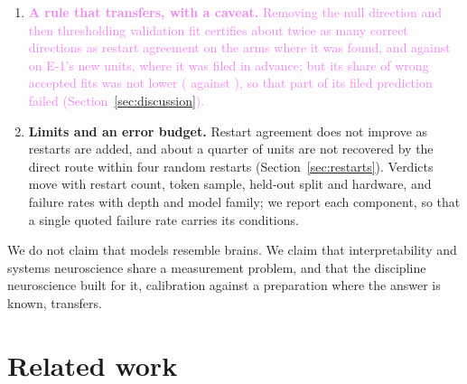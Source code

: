 \documentclass[10pt]{article}
\newcommand{\draft}[1]{\textcolor{violet}{#1}}
\begin{document}
\begin{enumerate}
{  \eOneNeoDelta{} \eOneNeoCI{} on GPT-Neo (Section~\ref{sec:eone}). Five earlier conditions re-scored
  on unseen documents give \poolTest{} \poolTestCI{} (\poolHeld{} on the fit's own documents). The
  failures being compared are the estimator's: a second estimator family recovers almost all of them
  (Section~\ref{sec:eone}; every run is listed in Appendix~\ref{app:arms}).}
  \item \draft{\textbf{A rule that transfers, with a caveat.} Removing the null direction and then
  thresholding validation fit certifies about twice as many correct directions as restart agreement
  on the arms where it was found, and \eOneRuleCorrect{} against \eOneRuleRestartCorrect{} on E-1's
  new units, where it was filed in advance; but its share of wrong accepted fits was not lower
  (\eOneRuleFcr{} against \eOneRuleRestartFcr), so that part of its filed prediction failed
  (Section~\ref{sec:discussion}).}
  \item \textbf{Limits and an error budget.} Restart agreement does not improve as restarts are
  added, and about a quarter of units are not recovered by the direct route within four random
  restarts (Section~\ref{sec:restarts}). Verdicts move with restart count, token sample, held-out
  split and hardware, and failure rates with depth and model family; we report each component, so
  that a single quoted failure rate carries its conditions.
\end{enumerate}
We do not claim that models resemble brains. We claim that interpretability and systems
neuroscience share a measurement problem, and that the discipline neuroscience built for it,
calibration against a preparation where the answer is known, transfers.

\section{Related work}
\label{sec:related}
\end{document}
